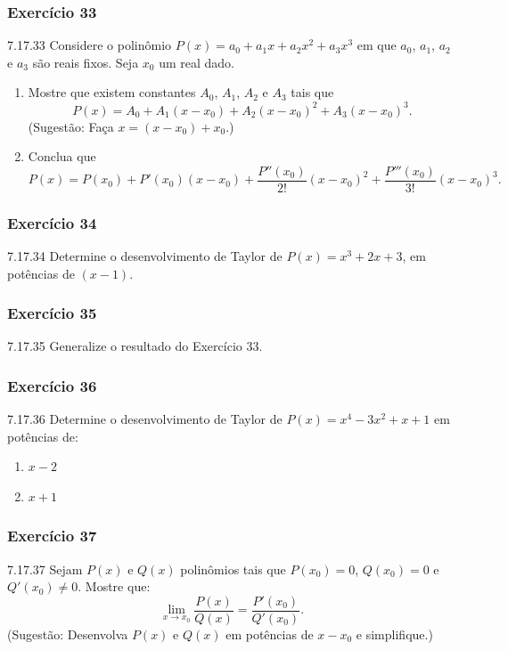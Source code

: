 \subsubsection*{Exercício 33}
\begin{exercicio}[33]{7.17.33}
Considere o polinômio $P(x) = a_0 + a_1 x + a_2 x^2 + a_3 x^3$ em que $a_0$, $a_1$, $a_2$ e $a_3$ são reais fixos. Seja $x_0$ um real dado.
\begin{enumerate}[label=\alph*)]
    \item Mostre que existem constantes $A_0$, $A_1$, $A_2$ e $A_3$ tais que
    \[
    P(x) = A_0 + A_1 (x - x_0) + A_2 (x - x_0)^2 + A_3 (x - x_0)^3.
    \]
    (Sugestão: Faça $x = (x - x_0) + x_0$.)
    \item Conclua que
    \[
    P(x) = P(x_0) + P'(x_0)(x - x_0) + \dfrac{P''(x_0)}{2!}(x - x_0)^2 + \dfrac{P'''(x_0)}{3!}(x - x_0)^3.
    \]
\end{enumerate}
\end{exercicio}

\subsubsection*{Exercício 34}
\begin{exercicio}[34]{7.17.34}
Determine o desenvolvimento de Taylor de $P(x) = x^3 + 2x + 3$, em potências de $(x - 1)$.
\end{exercicio}

\subsubsection*{Exercício 35}
\begin{exercicio}[35]{7.17.35}
Generalize o resultado do Exercício 33.
\end{exercicio}

\subsubsection*{Exercício 36}
\begin{exercicio}[36]{7.17.36}
Determine o desenvolvimento de Taylor de $P(x) = x^4 - 3x^2 + x + 1$ em potências de:
\begin{enumerate}[label=\alph*)]
    \item $x - 2$
    \item $x + 1$
\end{enumerate}
\end{exercicio}

\subsubsection*{Exercício 37}
\begin{exercicio}[37]{7.17.37}
Sejam $P(x)$ e $Q(x)$ polinômios tais que $P(x_0) = 0$, $Q(x_0) = 0$ e $Q'(x_0) \neq 0$. Mostre que:
\[
\lim_{x \to x_0} \dfrac{P(x)}{Q(x)} = \dfrac{P'(x_0)}{Q'(x_0)}.
\]
(Sugestão: Desenvolva $P(x)$ e $Q(x)$ em potências de $x - x_0$ e simplifique.)
\end{exercicio}

